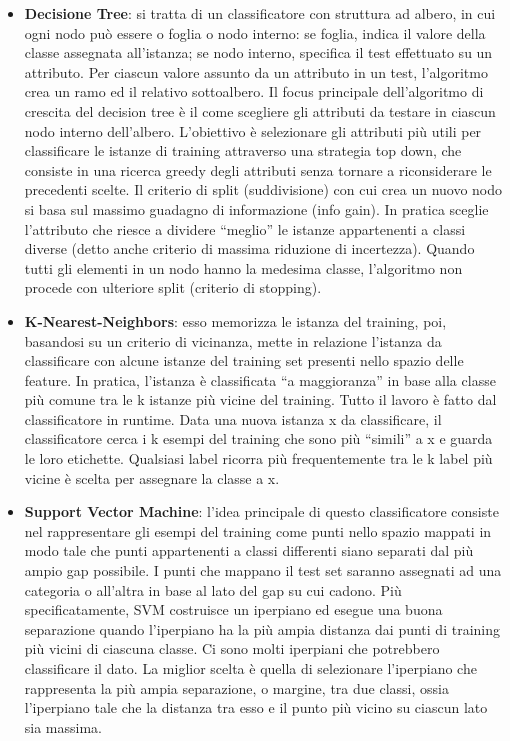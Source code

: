 \begin{itemize}
	\item \textbf{Decisione Tree}: si tratta di un classificatore con struttura ad albero, in cui ogni nodo può essere o foglia o nodo interno: se foglia, indica il valore della classe assegnata all'istanza; se nodo interno, specifica il test effettuato su un attributo. Per ciascun valore assunto da un attributo in un test, l'algoritmo crea un ramo ed il relativo sottoalbero. Il focus principale dell'algoritmo di crescita del decision tree è il come scegliere gli attributi da testare in ciascun nodo interno dell'albero. L'obiettivo è selezionare gli attributi più utili per classificare le istanze di training
	attraverso una strategia top down, che consiste in una ricerca greedy degli
	attributi senza tornare a riconsiderare le precedenti scelte. Il criterio di split (suddivisione) con cui crea un nuovo nodo si basa sul massimo guadagno di informazione (info gain). In pratica sceglie l'attributo che riesce a dividere “meglio” le istanze appartenenti a classi diverse (detto anche criterio di massima riduzione di incertezza). Quando tutti gli elementi in un nodo hanno la medesima classe, l'algoritmo non procede con ulteriore split (criterio di stopping).
	\item \textbf{K-Nearest-Neighbors}: esso memorizza le istanza del training, poi, basandosi su un criterio di vicinanza, mette in relazione l'istanza da classificare con alcune istanze del training set presenti nello spazio delle feature.  In pratica, l'istanza è classificata “a maggioranza” in base alla
	classe più comune tra le k istanze più vicine del training. Tutto il lavoro è fatto dal classificatore in runtime. Data una nuova istanza x da classificare, il classificatore cerca i k esempi del training che sono più “simili” a x e
	guarda le loro etichette. Qualsiasi label ricorra più frequentemente tra le k label più vicine è scelta per assegnare la classe a x.
	\item \textbf{Support Vector Machine}:  l'idea principale di questo classificatore consiste nel rappresentare gli esempi del training come punti nello spazio mappati in modo tale che punti appartenenti a classi differenti siano separati dal più ampio gap possibile. I punti che mappano il test set saranno assegnati ad una categoria o all'altra in base al lato del gap su cui cadono. Più specificatamente, SVM costruisce un iperpiano ed esegue una buona separazione quando l'iperpiano ha la più ampia distanza dai punti di training più vicini di ciascuna classe. Ci sono molti iperpiani che potrebbero classificare il dato. La miglior scelta è quella di selezionare l'iperpiano che rappresenta la più ampia separazione, o margine, tra due classi, ossia l'iperpiano tale che la distanza tra esso e il punto più vicino su ciascun lato sia massima.
\end{itemize}
